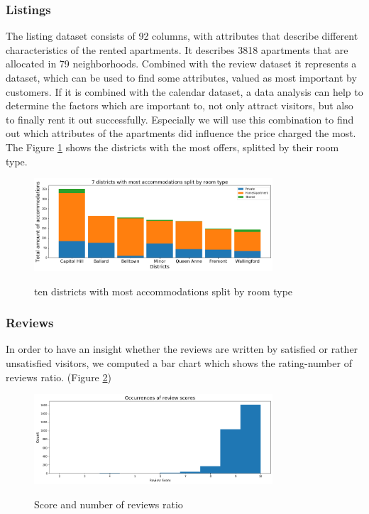 \documentclass[journal]{IEEEtran}
\begin{document}
\subsubsection{Listings}  The listing dataset consists of 92 columns, with attributes that describe different characteristics of the rented apartments. It describes 3818 apartments that are allocated in 79 neighborhoods. Combined with the review dataset it represents a dataset, which can be used to find some attributes, valued as most important by customers. If it is combined with the calendar dataset, a data analysis can help to determine the factors which are important to, not only attract visitors, but also to finally rent it out successfully. Especially we will use this combination to find out which attributes of the apartments did influence the price charged the most. The Figure \ref{districts_room_types} shows the districts with the most offers, splitted by their room type.
%
\begin{figure}
  \begin{center}
  \includegraphics[width=3.5in]{photo/4_most_acc_split_by_roomtype.png}\\
  \caption{ten districts with most accommodations split by room type}\label{districts_room_types}
  \end{center}
\end{figure}
\subsubsection{Reviews}
%
In order to have an insight whether the reviews are written by satisfied or rather unsatisfied visitors, we computed a bar chart which shows the rating-number of reviews ratio. (Figure \ref{score_reviews_ratio})
%
\begin{figure}
  \begin{center}
  \includegraphics[width=3.5in]{photo/2_1_occurences_of_review_scores.png}\\
  \caption{Score and number of reviews ratio}\label{score_reviews_ratio}
  \end{center}
\end{figure}
%
\end{document}
